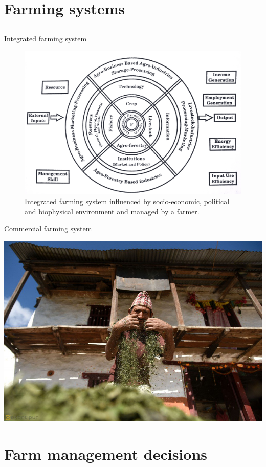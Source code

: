 \documentclass[12pt,ignorenonframetext,aspectratio=169]{beamer}
\begin{document}
\hypertarget{farming-systems}{%
\section{Farming systems}\label{farming-systems}}

\hypertarget{section-5}{%
\subsection{}\label{section-5}}

\begin{frame}{Integrated farming system}
\protect\hypertarget{integrated-farming-system}{}
\begin{figure}
\includegraphics[width=0.5\linewidth]{./figs/integrated_fs} \caption{Integrated farming system influenced by socio-economic, political and biophysical environment and managed by a farmer.}\label{fig:integrated-fs}
\end{figure}
\end{frame}

\begin{frame}{Commercial farming system}
\protect\hypertarget{commercial-farming-system}{}
\begin{center}\includegraphics[width=0.45\linewidth]{./figs/crop_value_addition} \end{center}
\end{frame}

\hypertarget{farm-management-decisions}{%
\section{Farm management decisions}\label{farm-management-decisions}}
\end{document}
